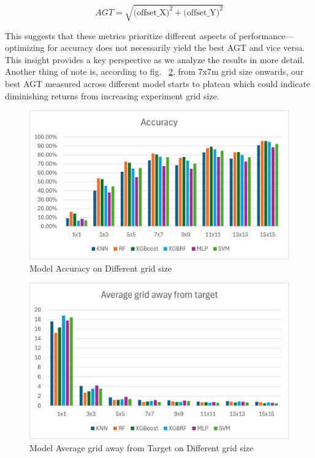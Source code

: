 \documentclass[conference]{IEEEtran}
\begin{document}
	\[ 
	AGT = \sqrt{\text{(offset\_X)}^2 + \text{(offset\_Y)}^2} 
	\]
	
	This suggests that these metrics prioritize different aspects of performance—optimizing for accuracy does not necessarily yield the best AGT and vice versa. This insight provides a key perspective as we analyze the results in more detail. Another thing of note is, according to fig. ~\ref{fig:AGT_dgrid_size}, from 7x7m grid size onwards, our best AGT measured across different model starts to plateau which could indicate diminishing returns from increasing experiment grid size.
	
	\begin{figure}[htbp]
		\centerline{\includegraphics[scale=0.65]{image3.png}}
		\caption{Model Accuracy on Different grid size}
		\label{fig:acc_dgird_size}
	\end{figure}
	
	\begin{figure}[htbp]
		\centerline{\includegraphics[scale=0.65]{image1.png}}
		\caption{Model Average grid away from Target on Different grid size}
		\label{fig:AGT_dgrid_size}
	\end{figure}
	
\end{document}
